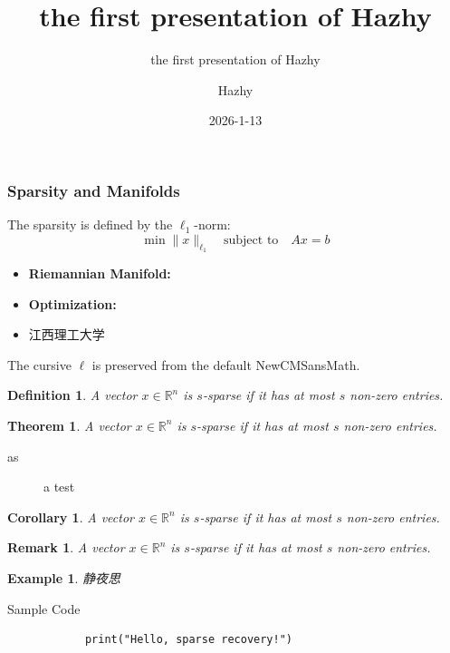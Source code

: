 \documentclass{ltx-talk}
\title{the first presentation of Hazhy}
\subtitle{the first presentation of Hazhy}
\author{Hazhy}
\institute{None}
\date{2026-1-13}
\newtheorem{definition}{\color{myblue}Definition}
\newtheorem{theorem}{\color{myblue}Theorem}
\newtheorem{corollary}{\color{myblue}Corollary}
\newtheorem{remark}{\color{myblue}Remark}
\newtheorem{example}{\color{myblue}Example}
\begin{document}
	\maketitle
	
	\begin{frame} 
		\frametitle{Sparsity and Manifolds}
		The sparsity is defined by the $\ell_1$-norm:
		\[ \min \|x\|_{\ell_1} \quad \text{subject to} \quad Ax = b \]
		
		\begin{itemize}
			\item \textbf{Riemannian Manifold:} 
			\item \textbf{Optimization:} 
			\item  江西理工大学
		\end{itemize}
		
		The cursive $\ell$ is preserved from the default NewCMSansMath.
	\end{frame}
	\begin{frame}
		
		\begin{definition}
			A vector $x \in \mathbb{R}^n$ is $s$-sparse if it has at most $s$ non-zero entries.
		\end{definition}
		\begin{theorem}
			A vector $x \in \mathbb{R}^n$ is $s$-sparse if it has at most $s$ non-zero entries.
		\end{theorem}
		\begin{description}
			\item[as]  a test
		\end{description}
		\begin{corollary}
			A vector $x \in \mathbb{R}^n$ is $s$-sparse if it has at most $s$ non-zero entries.
		\end{corollary}
		\begin{remark}
			A vector $x \in \mathbb{R}^n$ is $s$-sparse if it has at most $s$ non-zero entries.
		\end{remark}
		\begin{example}
			静夜思
		\end{example}
	\end{frame}
	
	
	\begin{frame*}{Sample Code}
		
		\begin{verbatim}
			print("Hello, sparse recovery!")
		\end{verbatim}
		
		
	\end{frame*}
	
\end{document}
